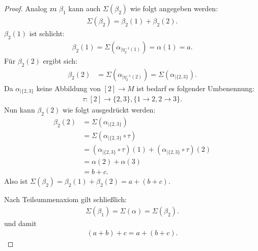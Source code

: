 \documentclass{article}
\begin{document}
\begin{proof}
  Analog zu $\beta_1$ kann auch $\Sigma(\beta_2)$ wie folgt angegeben werden:
  \begin{align*}
    \Sigma(\beta_2) = \beta_2(1) + \beta_2(2).
  \end{align*}
  $\beta_2(1)$ ist schlicht:
  \begin{align*}
    \beta_2(1) = \Sigma(\alpha_{\mid \eta_2^{-1}(1)}) = \alpha(1) = a.
  \end{align*}
  Für $\beta_2(2)$ ergibt sich:
  \begin{align*}
    \beta_2(2) &= \Sigma(\alpha_{\mid \eta_2^{-1}(2)}) 
    = \Sigma(\alpha_{\mid \{2, 3\}}).
  \end{align*}
  Da $\alpha_{\mid\{2, 3\}}$ keine Abbildung von $[2] \to M$ ist bedarf es folgender Umbenennung:
  \begin{align*}
    \tau \colon [2] \to \{ 2, 3\}, \{ 1 \to 2, 2 \to 3 \}.
  \end{align*}
  Nun kann $\beta_2(2)$ wie folgt ausgedrückt werden:
  \begin{align*}
    \beta_2(2) &= \Sigma(\alpha_{\mid \{2, 3\}})\\
    &= \Sigma(\alpha_{\mid \{2, 3\}} \circ \tau)\\
    &= (\alpha_{\mid \{ 2,3\}} \circ \tau)(1) + (\alpha_{\mid \{ 2,3\}} \circ \tau)(2)\\
    &= \alpha(2) + \alpha(3)\\
    &= b + c.
  \end{align*}
  Also ist $\Sigma(\beta_2) = \beta_2(1) + \beta_2(2) = a + (b + c)$.

  Nach Teilsummenaxiom gilt schließlich:
  \begin{align*}
    \Sigma(\beta_1) = \Sigma(\alpha) = \Sigma(\beta_2).
  \end{align*}
  und damit
  \begin{align*}
    (a + b) + c = a + (b + c).
  \end{align*}
  

\end{proof}
\end{document}
